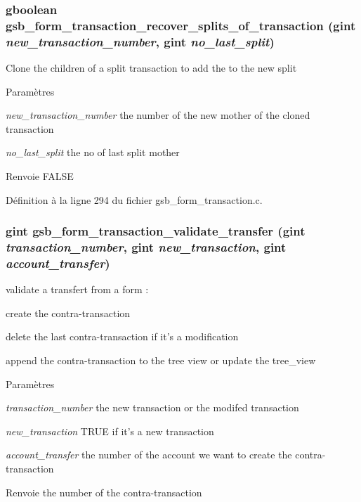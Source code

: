 \subsubsection[{gsb\_\-form\_\-transaction\_\-recover\_\-splits\_\-of\_\-transaction}]{\setlength{\rightskip}{0pt plus 5cm}gboolean gsb\_\-form\_\-transaction\_\-recover\_\-splits\_\-of\_\-transaction (gint {\em new\_\-transaction\_\-number}, \/  gint {\em no\_\-last\_\-split})}\label{gsb__form__transaction_8c_a318ee36f5765d28282106ff7b844b5ec}
Clone the children of a split transaction to add the to the new split


\begin{DoxyParams}{Paramètres}
\item[{\em new\_\-transaction\_\-number}]the number of the new mother of the cloned transaction \item[{\em no\_\-last\_\-split}]the no of last split mother\end{DoxyParams}
\begin{DoxyReturn}{Renvoie}
FALSE 
\end{DoxyReturn}


Définition à la ligne 294 du fichier gsb\_\-form\_\-transaction.c.

\subsubsection[{gsb\_\-form\_\-transaction\_\-validate\_\-transfer}]{\setlength{\rightskip}{0pt plus 5cm}gint gsb\_\-form\_\-transaction\_\-validate\_\-transfer (gint {\em transaction\_\-number}, \/  gint {\em new\_\-transaction}, \/  gint {\em account\_\-transfer})}\label{gsb__form__transaction_8c_a71dba4f06ba2ca8857c36a489844dad7}
validate a transfert from a form :
\begin{DoxyItemize}
\item create the contra-\/transaction
\item delete the last contra-\/transaction if it's a modification
\item append the contra-\/transaction to the tree view or update the tree\_\-view
\end{DoxyItemize}


\begin{DoxyParams}{Paramètres}
\item[{\em transaction\_\-number}]the new transaction or the modifed transaction \item[{\em new\_\-transaction}]TRUE if it's a new transaction \item[{\em account\_\-transfer}]the number of the account we want to create the contra-\/transaction\end{DoxyParams}
\begin{DoxyReturn}{Renvoie}
the number of the contra-\/transaction 
\end{DoxyReturn}


